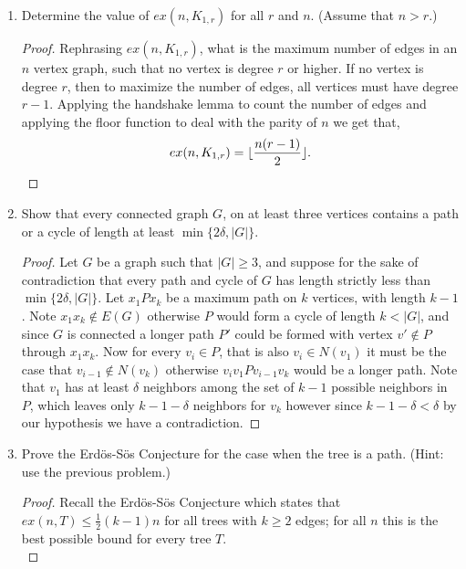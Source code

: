 \documentclass[12pt]{article}
\DeclarePairedDelimiter\floor{\lfloor}{\rfloor}
\begin{document}
\begin{enumerate}
\begin{proof}
It seems as though $S$ cannot contain a non $v_1v_2$ edge, as that would imply the flow through such an edge meets the capacity, which is infinity. Therefore $S$ only contains edges that correspond to vertices in $G$ and by construction $|S|$ is the minimum number of vertices separating $a$ and $b$. 
\end{proof}
\newpage


\item Determine the value of $ex(n,K_{1,r})$ for all $r$ and $n$. (Assume that $n>r.$)
\begin{proof} Rephrasing $ex(n,K_{1,r})$, what is the maximum number of edges in an $n$ vertex graph, such that no vertex is degree $r$ or higher. If no vertex is degree $r$, then to maximize the number of edges, all vertices must have degree $r - 1$. Applying the handshake lemma to count the number of edges and applying the floor function to deal with the parity of $n$ we get that, 
	\begin{equation*}
		ex(n,K_{1,r}) = \floor{\frac{n(r - 1)}{2}}.
	\end{equation*}
\end{proof}
\newpage


\item Show that every connected graph $G$, on at least three vertices contains a path or a cycle of length at least $\min\{2\delta, |G|\}.$
\begin{proof} Let $G$ be a graph such that $|G| \geq 3$, and suppose for the sake of contradiction that every path and cycle of $G$ has length strictly less than $\min\{2\delta, |G|\}.$ Let $x_1Px_k$ be a maximum path on $k$ vertices, with length $k - 1$. Note $x_1x_k \not\in E(G)$ otherwise $P$ would form a cycle of length $k < |G|$, and since $G$ is connected a longer path $P'$ could be formed with vertex $v' \not\in P$ through $x_1x_k$. Now for every $v_i \in P$, that is also $v_i \in N(v_1)$ it must be the case that $v_{i - 1} \not\in N(v_k)$ otherwise $v_iv_1Pv_{i - 1}v_k$ would be a longer path. Note that $v_1$ has at least $\delta$ neighbors among the set of $k - 1$ possible neighbors in $P$, which leaves only $k - 1 - \delta$ neighbors for $v_k$ however since $k - 1 - \delta < \delta$ by our hypothesis we have a contradiction.
	
	


\end{proof}
\newpage


\item Prove the Erd\"{o}s-S\"os Conjecture for the case when the tree is a path. (Hint: use the previous problem.)
\begin{proof} Recall the Erd\"{o}s-S\"os Conjecture which states that $ex(n, T) \leq \frac{1}{2}(k - 1)n$ for all trees with $k \geq 2$ edges; for all $n$ this is the best possible bound for every tree $T$. \\


\end{proof}
\end{enumerate}
\end{document}
